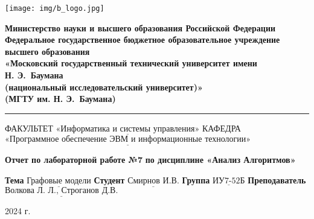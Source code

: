 \begin{titlepage}
	\fontsize{12pt}{12pt}\selectfont
	\noindent \begin{minipage}{0.15\textwidth}
		\texttt{[image: img/b\_logo.jpg]}
	\end{minipage}
	\noindent\begin{minipage}{0.9\textwidth}\centering
		\textbf{Министерство науки и высшего образования Российской Федерации}\\
		\textbf{Федеральное государственное бюджетное образовательное учреждение высшего образования}\\
		\textbf{«Московский государственный технический университет имени}\\
        \textbf{Н. Э.~Баумана}\\
		\textbf{(национальный исследовательский университет)»}\\
		\textbf{(МГТУ им. Н. Э.~Баумана)}
	\end{minipage}
	
	\noindent\rule{18cm}{3pt}
	\newline\newline
	\noindent ФАКУЛЬТЕТ $\underline{\text{«Информатика и системы управления»}}$ \newline
	\noindent КАФЕДРА $\underline{\text{«Программное обеспечение ЭВМ и информационные технологии»}}$\newline\newline\newline\newline\newline\newline\newline\newline
	
	
	\begin{center}
		\noindent\begin{minipage}{1.3\textwidth}\centering
		\Large\textbf{   Отчет по лабораторной работе №7}\newline
		\textbf{по дисциплине «Анализ Алгоритмов»}\newline\newline\newline
		\end{minipage}
	\end{center}
	
	\noindent\textbf{Тема} 			$\underline{\text{Графовые модели}}$\newline\newline
	\noindent\textbf{Студент} 		$\underline{\text{Смирнов И.В.}}$\newline\newline
	\noindent\textbf{Группа} 		$\underline{\text{ИУ7-52Б}}$\newline\newline
	\noindent\textbf{Преподаватель} $\underline{\text{Волкова Л. Л., Строганов Д.В.}}$\newline
	
	\begin{center}
        \vfill
		2024 г.
	\end{center}
	\restoregeometry
\end{titlepage}